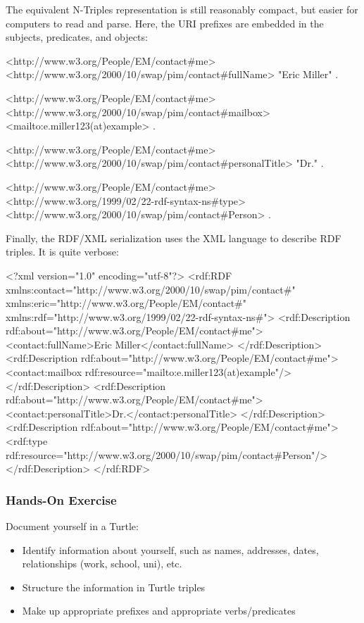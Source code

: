 \noindent The equivalent N-Triples representation is still reasonably compact, but easier for computers to read and parse. Here, the URI prefixes are embedded in the subjects, predicates, and objects:

\begin{textcode}
<http://www.w3.org/People/EM/contact#me> 
 <http://www.w3.org/2000/10/swap/pim/contact#fullName> 
  "Eric Miller" .

<http://www.w3.org/People/EM/contact#me>
 <http://www.w3.org/2000/10/swap/pim/contact#mailbox> 
  <mailto:e.miller123(at)example> .

<http://www.w3.org/People/EM/contact#me>
 <http://www.w3.org/2000/10/swap/pim/contact#personalTitle> 
  "Dr." .
 
<http://www.w3.org/People/EM/contact#me>
 <http://www.w3.org/1999/02/22-rdf-syntax-ns#type>
  <http://www.w3.org/2000/10/swap/pim/contact#Person> .
\end{textcode}

\begin{samepage}
\noindent Finally, the RDF/XML serialization uses the XML language to describe RDF triples. It is quite verbose: 

\begin{xmlcode}
<?xml version="1.0" encoding="utf-8"?>
<rdf:RDF xmlns:contact="http://www.w3.org/2000/10/swap/pim/contact#" 
xmlns:eric="http://www.w3.org/People/EM/contact#" 
xmlns:rdf="http://www.w3.org/1999/02/22-rdf-syntax-ns#">
  <rdf:Description rdf:about="http://www.w3.org/People/EM/contact#me">
    <contact:fullName>Eric Miller</contact:fullName>
  </rdf:Description>
  <rdf:Description rdf:about="http://www.w3.org/People/EM/contact#me">
    <contact:mailbox rdf:resource="mailto:e.miller123(at)example"/>
  </rdf:Description>
  <rdf:Description rdf:about="http://www.w3.org/People/EM/contact#me">
    <contact:personalTitle>Dr.</contact:personalTitle>
  </rdf:Description>
  <rdf:Description rdf:about="http://www.w3.org/People/EM/contact#me">
    <rdf:type rdf:resource="http://www.w3.org/2000/10/swap/pim/contact#Person"/>
  </rdf:Description>
</rdf:RDF>
\end{xmlcode}
\end{samepage}

\begin{tcolorbox}[colback=code]
\subsubsection*{Hands-On Exercise}

Document yourself in a Turtle:
\begin{itemize}
	\item Identify information about yourself, such as names, addresses, dates, relationships (work, school, uni), etc.
	\item Structure the information in Turtle triples
	\item Make up appropriate prefixes and appropriate verbs/predicates
\end{itemize}
\end{tcolorbox}

